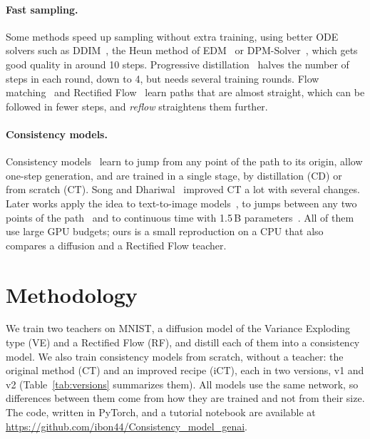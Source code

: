 \documentclass{article}
\begin{document}
\paragraph{Fast sampling.} Some methods speed up sampling without extra
training, using better ODE solvers such as DDIM~\cite{song2021ddim}, the Heun
method of EDM~\cite{karras2022edm} or DPM-Solver~\cite{lu2022dpmsolver}, which
gets good quality in around 10 steps. Progressive
distillation~\cite{salimans2022progressive} halves the number of steps in each
round, down to 4, but needs several training rounds. Flow
matching~\cite{lipman2023flow} and Rectified Flow~\cite{liu2023flow} learn
paths that are almost straight, which can be followed in fewer steps, and
\emph{reflow} straightens them further.

\paragraph{Consistency models.} Consistency
models~\cite{song2023consistency} learn to jump from any point of the path to
its origin, allow one-step generation, and are trained in a single stage, by
distillation (CD) or from scratch (CT). Song and
Dhariwal~\cite{song2024improved} improved CT a lot with several changes. Later
works apply the idea to text-to-image models~\cite{luo2023lcm}, to jumps
between any two points of the path~\cite{kim2024ctm} and to continuous time
with 1.5\,B parameters~\cite{lu2025scm}. All of them use large GPU budgets; ours
is a small reproduction on a CPU that also compares a diffusion and a Rectified
Flow teacher.

\section{Methodology}
\label{sec:methodology}

We train two teachers on MNIST, a diffusion model of the Variance Exploding
type (VE) and a Rectified Flow (RF), and distill each of them into a
consistency model. We also train consistency models from scratch, without a
teacher: the original method (CT) and an improved recipe (iCT), each in two
versions, v1 and v2 (Table~\ref{tab:versions} summarizes them). All models use
the same network, so differences between them come from how they are trained and
not from their size. The code, written in PyTorch,
and a tutorial notebook are available at
\url{https://github.com/ibon44/Consistency_model_genai}.
\end{document}
